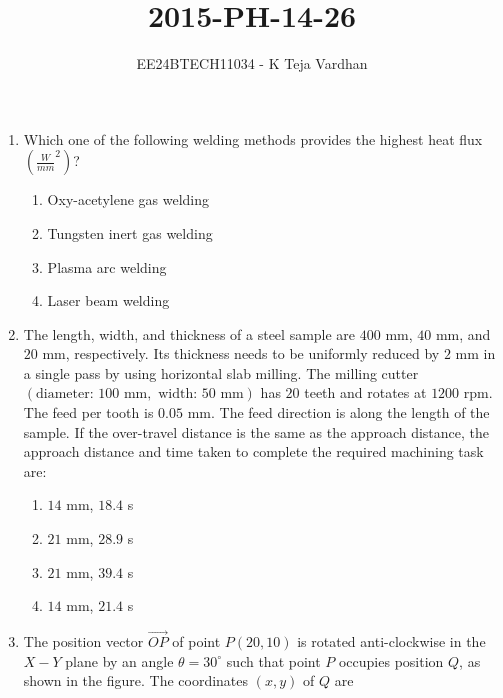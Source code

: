 \documentclass{article}
\newcommand{\brak}[1]{\left( #1 \right)}
\begin{document}

\title{2015-PH-14-26}
\author{EE24BTECH11034 - K Teja Vardhan}
{\let\newpage\relax\maketitle}

\begin{enumerate}

\item Which one of the following welding methods provides the highest heat flux $\brak{\frac{W}{mm}^2}$?

\begin{enumerate}
    \item Oxy-acetylene gas welding
    \item Tungsten inert gas welding
    \item Plasma arc welding
    \item Laser beam welding
\end{enumerate}

\item The length, width, and thickness of a steel sample are $400$ mm, $40$ mm, and $20$ mm, respectively. Its thickness needs to be uniformly reduced by $2$ mm in a single pass by using horizontal slab milling. The milling cutter $\brak{\text{diameter: } 100 \text{ mm}, \text{ width: } 50 \text{ mm}}$ has $20$ teeth and rotates at $1200$ rpm. The feed per tooth is $0.05$ mm. The feed direction is along the length of the sample. If the over-travel distance is the same as the approach distance, the approach distance and time taken to complete the required machining task are:

\begin{enumerate}
    \item $14$ mm, $18.4$ s
    \item $21$ mm, $28.9$ s
    \item $21$ mm, $39.4$ s
    \item $14$ mm, $21.4$ s
\end{enumerate}

\item The position vector $\overrightarrow{OP}$ of point $P \brak{20, 10}$ is rotated anti-clockwise in the $X-Y$ plane by an angle $\theta = 30^\circ$ such that point $P$ occupies position $Q$, as shown in the figure. The coordinates $\brak{x, y}$ of $Q$ are

\begin{center}
\end{center}


\end{enumerate}
\end{document}
